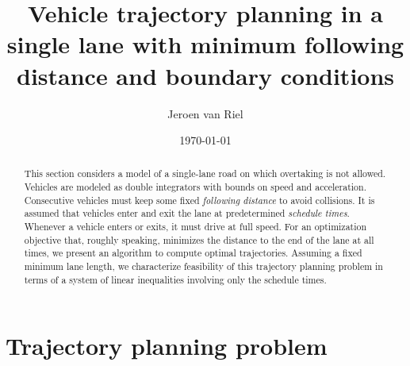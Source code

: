 \documentclass[a4paper]{article}
\author{Jeroen van Riel}
\date{\monthyeardate\today}
\title{Vehicle trajectory planning in a single lane with minimum following
  distance and boundary conditions}
\theoremstyle{definition}
\theoremstyle{plain}
\begin{document}
\maketitle

\begin{abstract}
  This section considers a model of a single-lane road on which overtaking is
  not allowed.
  Vehicles are modeled as double integrators with bounds on speed and
  acceleration. Consecutive vehicles must keep some fixed \textit{following
    distance} to avoid collisions.
  It is assumed that vehicles enter and exit the lane at
  predetermined \textit{schedule times}. Whenever a vehicle enters or exits, it
  must drive at full speed.
  For an optimization objective that, roughly speaking, minimizes the distance
  to the end of the lane at all times, we present an algorithm to compute
  optimal trajectories.
  Assuming a fixed minimum lane length, we characterize feasibility of this
  trajectory planning problem in terms of a system of linear inequalities
  involving only the schedule times.
\end{abstract}


\newcommand\halfopen[2]{\ensuremath{[#1,#2)}}
\newcommand\openhalf[2]{\ensuremath{(#1,#2]}}

\renewcommand{\labelitemii}{\textbullet}
\renewcommand{\labelitemiii}{\textbullet}

\section{Trajectory planning problem}
\end{document}
